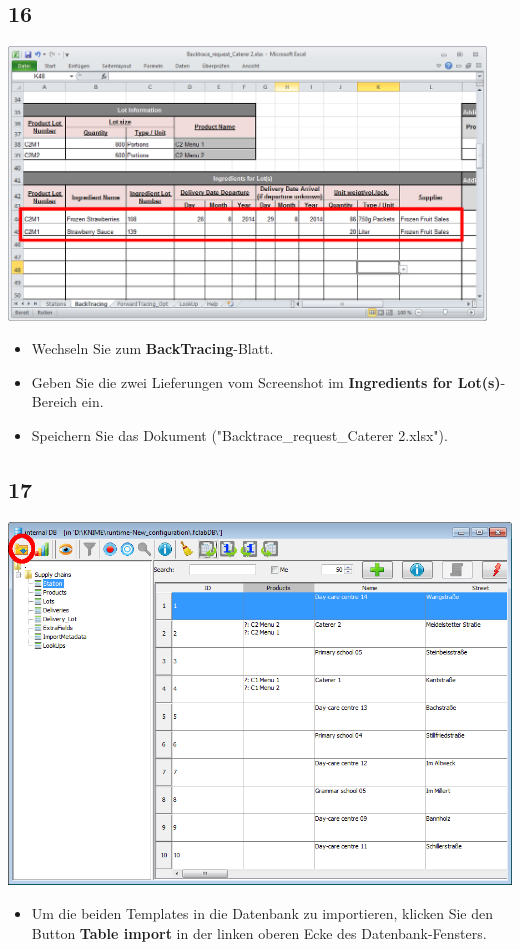 \documentclass{beamer}
\begin{document}
\subsection{16}
\begin{frame}
	\begin{center}
  		\includegraphics[width=0.95\textwidth]{16.png}
	\end{center}
	\begin{itemize}
		\item Wechseln Sie zum \textbf{BackTracing}-Blatt.
		\item Geben Sie die zwei Lieferungen vom Screenshot im \textbf{Ingredients for Lot(s)}-Bereich ein.
		\item Speichern Sie das Dokument ("Backtrace\_request\_Caterer 2.xlsx").
	\end{itemize}
\end{frame}

\subsection{17}
\begin{frame}
	\begin{center}
  		\includegraphics[height=0.6\textheight]{17.png}
	\end{center}
	\begin{itemize}
		\item Um die beiden Templates in die Datenbank zu importieren, klicken Sie den Button \textbf{Table import} in der linken oberen Ecke des Datenbank-Fensters.
	\end{itemize}
\end{frame}
\end{document}
